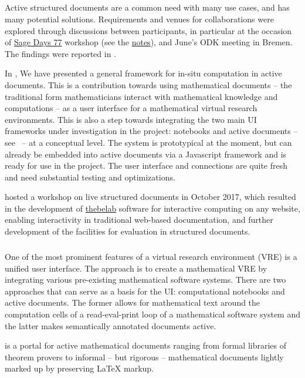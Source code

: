 \subparagraph{}
\label{UI@structdocs}

Active structured documents are a common need with many use cases, and has many potential solutions.
Requirements and venues for collaborations were explored through discussions between participants,
in particular at the occasion of \href{https://wiki.sagemath.org/days77/}{Sage Days 77} workshop
(see the \href{https://wiki.sagemath.org/days77/live-structured-documents}{notes}), and June's ODK
meeting in Bremen. The findings were reported in .

In , We have presented a general framework for in-situ computation in active documents. This is
a contribution towards using mathematical documents -- the traditional form mathematicians
interact with mathematical knowledge and computations -- as a user interface for a
mathematical virtual research environments. This is also a step towards integrating the
two main UI frameworks under investigation in the \ODK project: \Jupyter notebooks and
active documents -- see~ -- at a conceptual level. The system is
prototypical at the moment, but can already be embedded into active documents via a
Javascript framework and is ready for use in the \ODK project. The user interface and \SCSCP
connections are quite fresh and need substantial testing and optimizations.

\ODK hosted a workshop on live structured documents in October 2017,
which resulted in the development of \href{https://github.com/minrk/thebelab}{thebelab} software for interactive computing on any website,
enabling interactivity in traditional web-based documentation,
and further development of the \MathHub facilities for evaluation in structured documents.

\subparagraph{}
\label{UI@mathhub}

One of the most prominent features of a virtual research environment (VRE) is a unified user interface. The \ODK approach is to create a mathematical VRE by integrating various pre-existing mathematical software systems. There are two approaches that can serve as a basis for the \ODK UI: computational notebooks and active documents. The former allows for mathematical text around the computation cells of a read-eval-print loop of a mathematical software system and the latter makes semantically annotated documents active.

\MathHub is a portal for active mathematical documents ranging from formal libraries of theorem provers to informal – but rigorous – mathematical documents lightly marked up by preserving LaTeX markup.

